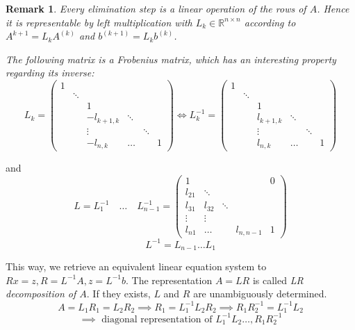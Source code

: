 \documentclass[a4paper]{article}
\numberwithin{lecref}{section}
\theoremstyle{break}
\newtheorem*{Remark}{Remark}
\begin{document}
\begin{Remark}
  Every elimination step is a linear operation of the rows of $A$.
  Hence it is representable by left multiplication with $L_k \in \mathbb R^{n \times n}$ according to $A^{k+1} = L_k A^{(k)}$ and $b^{(k+1)} = L_k b^{(k)}$.

  The following matrix is a \emph{Frobenius matrix}, which has an interesting property regarding its inverse:
  \[
    L_k = \begin{pmatrix}
      1 &        &   &                 &        & \\
        & \ddots &   &                 &        & \\ 
        &        & 1 &                 &        & \\
        &        & -l_{k+1,k} & \ddots &        & \\
        &        & \vdots     &        & \ddots & \\
        &        & -l_{n,k}   & \dots  &        & 1
    \end{pmatrix}
    \iff
    L_k^{-1} = \begin{pmatrix}
      1 &        &   &                 &        & \\
        & \ddots &   &                 &        & \\ 
        &        & 1 &                 &        & \\
        &        & l_{k+1,k}  & \ddots &        & \\
        &        & \vdots     &        & \ddots & \\
        &        & l_{n,k}    & \dots  &        & 1
    \end{pmatrix}
  \]
\end{Remark}
and
\[
  L = L_1^{-1} \quad \dots \quad L_{n-1}^{-1} =
  \begin{pmatrix}
    1      &        &        &           & 0 \\
    l_{21} & \ddots &        &           & \\
    l_{31} & l_{32} & \ddots &           & \\
    \vdots & \vdots &        &           & \\
    l_{n1} & \dots  &        & l_{n,n-1} & 1
  \end{pmatrix}
\] \[
  L^{-1} = L_{n-1} \dots L_1
\]

This way, we retrieve an equivalent linear equation system to $Rx = z, R = L^{-1} A, z = L^{-1} b$.
The representation $A = LR$ is called \emph{LR decomposition of $A$}.
If they exists, $L$ and $R$ are unambiguously determined.
\[
  A = L_1 R_1 = L_2 R_2
  \implies R_1 = L_1^{-1} L_2 R_2
  \implies R_1 R_2^{-1} = L_1^{-1} L_2
\] \[
  \implies \text{ diagonal representation of } L_1^{-1} L_2 \dots, R_1 R_2^{-1}
\]
\end{document}
